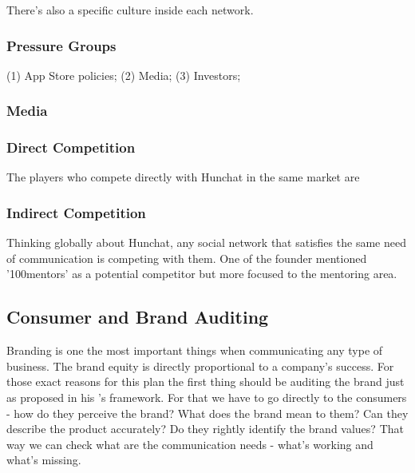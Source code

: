 \documentclass[12pt]{article}
\begin{document}
	 There's also a specific culture inside each network.
	 	
	\subsubsection{Pressure Groups}
	(1) App Store policies; (2) Media; (3) Investors; 
	
	\subsubsection{Media}
	
	\subsubsection{Direct Competition}
	The players who compete directly with Hunchat in the same market are
	
	\subsubsection{Indirect Competition}
	Thinking globally about Hunchat, any social network that satisfies the same need of communication is competing with them. One of the founder mentioned '100mentors' as a potential competitor but more focused to the mentoring area.
	
	
\subsection{Consumer and Brand Auditing}
Branding is one the most important things when communicating any type of business. The brand equity is directly proportional to a company's success. For those exact reasons for this plan the first thing should be auditing the brand just as \citeauthor{kliatchko} proposed in his \citeyear{kliatchko}'s framework. For that we have to go directly to the consumers - how do they perceive the brand? What does the brand mean to them? Can they describe the product accurately? Do they rightly identify the brand values? That way we can check what are the communication needs - what's working and what's missing.
\end{document}
